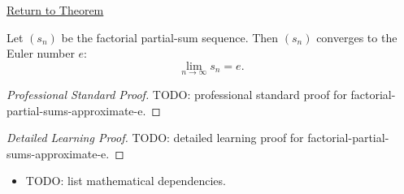 \newpage
{}
\label{prf:factorial-partial-sums-approximate-e}

\begin{remark*}[Return]
\hyperref[thm:factorial-partial-sums-approximate-e]{Return to Theorem}
\end{remark*}

\begin{theorem*}
Let $(s_n)$ be the factorial partial-sum sequence. Then $(s_n)$ converges
to the Euler number $e$:
\[
  \lim_{n\to\infty}s_n=e.
\]

\smallskip
\noindent
\end{theorem*}

\begin{proof}[Professional Standard Proof]
\LRAProofBodyStart
TODO: professional standard proof for factorial-partial-sums-approximate-e.
\end{proof}

\begin{proof}[Detailed Learning Proof]
\LRAProofBodyStart
TODO: detailed learning proof for factorial-partial-sums-approximate-e.
\end{proof}

\begin{remark*}
\end{remark*}

\begin{dependencies}
\begin{itemize}
  \item TODO: list mathematical dependencies.
\end{itemize}
\end{dependencies}

\clearpage

